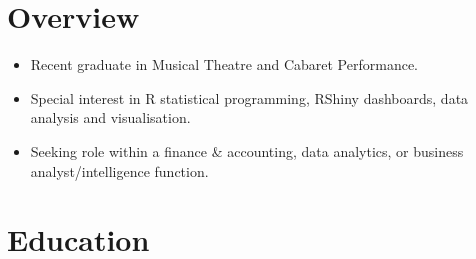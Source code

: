 \documentclass[11pt,a4paper,]{awesome-cv}
\providecommand{\tightlist}{%
	\setlength{\itemsep}{0pt}\setlength{\parskip}{0pt}}
\begin{document}
\makecvheader






\hypertarget{overview}{%
\section{Overview}\label{overview}}

\begin{itemize}
\tightlist
\item
  Recent graduate in Musical Theatre and Cabaret Performance.
\item
  Special interest in R statistical programming, RShiny dashboards, data
  analysis and visualisation.
\item
  Seeking role within a finance \& accounting, data analytics, or
  business analyst/intelligence function.
\end{itemize}

\hypertarget{education}{%
\section{Education}\label{education}}

\begin{cventries}
    \vspace{-4.0mm}
    \vspace{-4.0mm}
    \vspace{-4.0mm}
\end{cventries}
\end{document}
